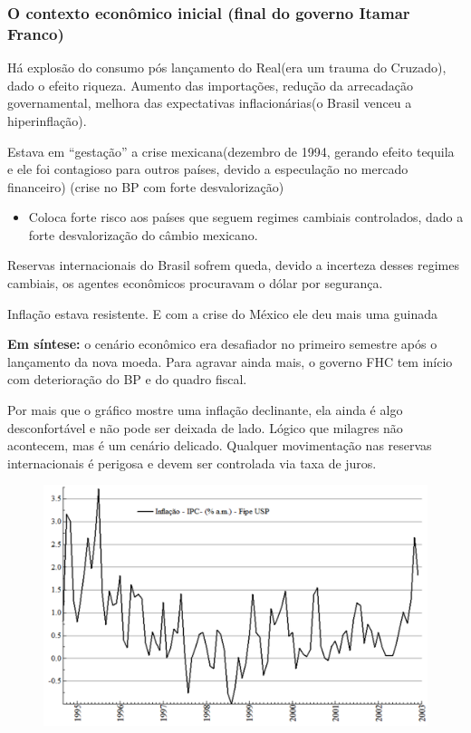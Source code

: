 \documentclass[a4paper,12pt]{article}[abntex2]
\begin{document}
\subsubsection{\textbf{O contexto econômico inicial (final do governo Itamar Franco)}}
Há explosão do consumo pós lançamento do Real(era um trauma do Cruzado), dado o efeito riqueza. Aumento das importações, redução da arrecadação governamental, melhora das expectativas inflacionárias(o Brasil venceu a hiperinflação).

Estava em “gestação” a crise mexicana(dezembro de 1994, gerando efeito tequila e ele foi contagioso para outros países, devido a especulação no mercado financeiro) (crise no BP com forte desvalorização)\begin{itemize}
    \item Coloca forte risco aos países que seguem regimes cambiais controlados, dado a forte desvalorização do câmbio mexicano.
\end{itemize}

Reservas internacionais do Brasil sofrem queda, devido a incerteza desses regimes cambiais, os agentes econômicos procuravam o dólar por segurança.

Inflação estava resistente. E com a crise do México ele deu mais uma guinada

\textbf{Em síntese:} o cenário econômico era desafiador no primeiro semestre após o lançamento da nova moeda. Para agravar ainda mais, o governo FHC tem início com deterioração do BP e do quadro fiscal.

Por mais que o gráfico mostre uma inflação declinante, ela ainda é algo desconfortável e não pode ser deixada de lado. Lógico que milagres não acontecem, mas é um cenário delicado. Qualquer movimentação nas reservas internacionais é perigosa e devem ser controlada via taxa de juros.
\begin{figure}[H]
    \centering
    \includegraphics[width=0.7\linewidth]{Imagens/a14i1.png}
\end{figure}
\end{document}
